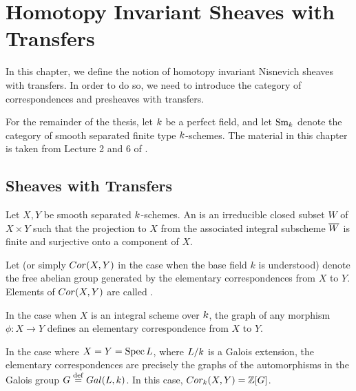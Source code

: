 \newpage
\chapter{Homotopy Invariant Sheaves with Transfers}\label{sect_hist}

In this chapter, we define the notion of homotopy invariant
Nisnevich sheaves with transfers. In order to do so, we need to
introduce the category of correspondences and presheaves with 
transfers. 

For the remainder of the thesis, let $k$ be a perfect 
field, and let $\mathrm{Sm}_{k}$ denote the category of smooth separated 
finite type $k$-schemes. The material in this chapter is 
taken from Lecture 2 and 6 of \cite{MVW}.

\section{Sheaves with Transfers}

\begin{defn}\label{def_cor}
Let $X, Y$ be smooth separated $k$-schemes.  An
 is an irreducible
closed subset $W$ of $X \times Y$ such that the projection to $X$
from the associated integral subscheme $\overline{W}$ is finite and
surjective onto a component of $X$.

Let  (or simply $Cor(X, Y)$ in the
case when the base field $k$ is understood) denote the free abelian
group generated by the elementary correspondences from $X$ to
$Y$. Elements of $Cor(X, Y)$ are called .
\end{defn}

\begin{ex}
In the case when $X$ is an integral scheme over $k$, the 
graph of any morphism $\phi: X \to Y$ defines an elementary 
correspondence from $X$ to $Y$. 

In the case where $X = Y = \mathrm{Spec}\, L$, where $L/k$ is a 
Galois extension, the elementary correspondences are precisely the 
graphs of the automorphisms in the Galois group $G \stackrel{\mathrm{def}}{=} Gal(L, 
k)$. In this case, $Cor_{k}(X, Y) = \mathbb{Z}[G]$.
\end{ex}

